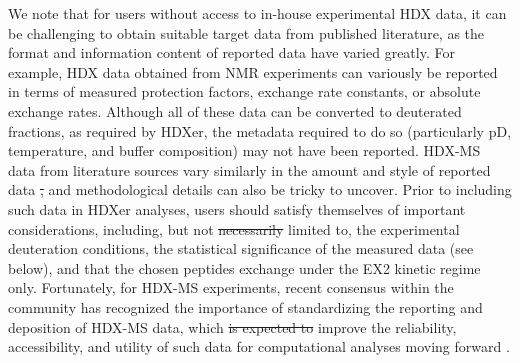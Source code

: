 \documentclass[9pt,tutorial]{livecoms}
\providecommand{\DIFadd}[1]{{\protect\color{blue}\uwave{#1}}} %
\providecommand{\DIFdel}[1]{{\protect\color{red}\sout{#1}}}                      %
\providecommand{\DIFaddbegin}{} %
\providecommand{\DIFaddend}{} %
\providecommand{\DIFdelbegin}{} %
\providecommand{\DIFdelend}{} %
\begin{document}
We note that for users without access to in-house experimental HDX data, it can be challenging to obtain suitable target data from published literature, as the format and information content of reported data have varied greatly.
For example, HDX data obtained from NMR experiments can variously be reported in terms of measured protection factors, exchange rate constants, or absolute exchange rates.
Although all of these data can be converted to deuterated fractions, as required by HDXer, the metadata required to do so (particularly pD, temperature, and buffer composition) may not have been reported.
HDX-MS data from literature sources vary similarly in the amount and style of reported data \DIFdelbegin \DIFdel{, }\DIFdelend and methodological details can also be tricky to uncover.
Prior to including such data in HDXer analyses, users should \DIFaddbegin \DIFadd{therefore }\DIFaddend satisfy themselves of important considerations, including, but not \DIFdelbegin \DIFdel{necessarily }\DIFdelend limited to, the experimental deuteration conditions, the statistical significance of the measured data (see below), and that the chosen peptides exchange under the EX2 kinetic regime only.
Fortunately, for HDX-MS experiments, recent consensus within the community has recognized the importance of standardizing the reporting and deposition of HDX-MS data, which \DIFdelbegin \DIFdel{is expected to }\DIFdelend \DIFaddbegin \DIFadd{should }\DIFaddend improve the reliability, accessibility, and utility of such data for computational analyses moving forward \cite{Masson2019}.
\end{document}
